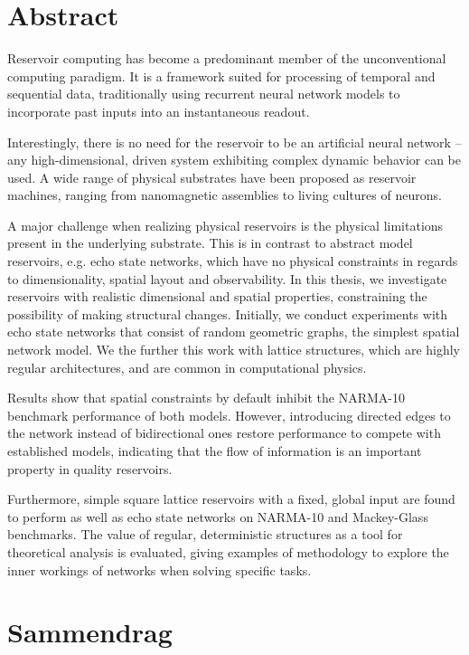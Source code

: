 \chapter*{Abstract}

Reservoir computing has become a predominant member of the unconventional
computing paradigm. It is a framework suited for processing of temporal and
sequential data, traditionally using recurrent neural network models to
incorporate past inputs into an instantaneous readout.

Interestingly, there is no need for the reservoir to be an artificial neural
network -- any high-dimensional, driven system exhibiting complex dynamic
behavior can be used. A wide range of physical substrates have been proposed as
reservoir machines, ranging from nanomagnetic assemblies to living cultures of
neurons.

A major challenge when realizing physical reservoirs is the physical limitations
present in the underlying substrate. This is in contrast to abstract model
reservoirs, e.g. echo state networks, which have no physical constraints in
regards to dimensionality, spatial layout and observability. In this thesis, we
investigate reservoirs with realistic dimensional and spatial properties,
constraining the possibility of making structural changes. Initially, we conduct
experiments with echo state networks that consist of random geometric graphs,
the simplest spatial network model. We the further this work with lattice
structures, which are highly regular architectures, and are common in
computational physics.

Results show that spatial constraints by default inhibit the NARMA-10 benchmark
performance of both models. However, introducing directed edges to the network
instead of bidirectional ones restore performance to compete with established
models, indicating that the flow of information is an important property in
quality reservoirs.

Furthermore, simple square lattice reservoirs with a fixed, global input are
found to perform as well as echo state networks on NARMA-10 and Mackey-Glass
benchmarks. The value of regular, deterministic structures as a tool for
theoretical analysis is evaluated, giving examples of methodology to explore the
inner workings of networks when solving specific tasks.

\chapter*{Sammendrag}

